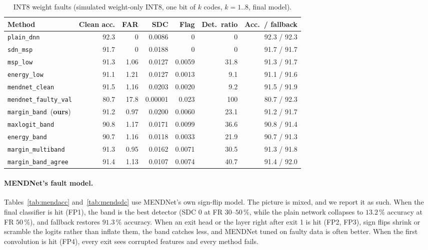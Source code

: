 \documentclass[10pt,a4paper]{article}
\newcommand{\meth}[1]{\texttt{#1}}
\newcommand{\ours}{\meth{margin\_band}}
\begin{document}
\begin{table}[H]
\centering\small
\caption{INT8 weight faults (simulated weight-only INT8, one bit of $k$ codes, $k=1..8$, final model).}
\label{tab:int8}
\begin{adjustbox}{max width=\linewidth}
\begin{tabular}{@{}lrrrrrr@{}}
\toprule
Method & Clean acc. & FAR & SDC & Flag & Det.\ ratio & Acc.\ / fallback \\
\midrule
\meth{plain\_dnn}          & 92.3 & 0    & 0.0086  & 0       & 0    & 92.3 / 92.3 \\
\meth{sdn\_msp}            & 91.7 & 0    & 0.0188  & 0       & 0    & 91.7 / 91.7 \\
\meth{msp\_low}            & 91.3 & 1.06 & 0.0127  & 0.0059  & 31.8 & 91.3 / 91.7 \\
\meth{energy\_low}         & 91.1 & 1.21 & 0.0127  & 0.0013  & 9.1  & 91.1 / 91.6 \\
\meth{mendnet\_clean}      & 91.5 & 1.16 & 0.0203  & 0.0020  & 9.2  & 91.5 / 91.9 \\
\meth{mendnet\_faulty\_val}& 80.7 & 17.8 & 0.00001 & 0.023   & 100  & 80.7 / 92.3 \\
\midrule
\ours\ (\textbf{ours})     & 91.2 & 0.97 & 0.0200  & 0.0060  & 23.1 & 91.2 / 91.7 \\
\meth{maxlogit\_band}      & 90.8 & 1.17 & 0.0171  & 0.0099  & 36.6 & 90.8 / 91.4 \\
\meth{energy\_band}        & 90.7 & 1.16 & 0.0118  & 0.0033  & 21.9 & 90.7 / 91.3 \\
\meth{margin\_multiband}   & 91.3 & 0.95 & 0.0162  & 0.0071  & 30.5 & 91.3 / 91.8 \\
\meth{margin\_band\_agree} & 91.4 & 1.13 & 0.0107  & 0.0074  & 40.7 & 91.4 / 92.0 \\
\bottomrule
\end{tabular}
\end{adjustbox}
\end{table}

\paragraph{MENDNet's fault model.} Tables~\ref{tab:mendacc} and~\ref{tab:mendsdc} use MENDNet's own
sign-flip model. The picture is mixed, and we report it as such. When the final classifier is hit (FP1),
the band is the best detector (SDC $0$ at FR $30$--$50\,\%$, while the plain network collapses to
$13.2\,\%$ accuracy at FR $50\,\%$), and fallback restores $91.3\,\%$ accuracy. When an exit head or the
layer right after exit 1 is hit (FP2, FP3), sign flips shrink or scramble the logits rather than inflate
them, the band catches less, and MENDNet tuned on faulty data is often better. When the first convolution
is hit (FP4), every exit sees corrupted features and every method fails.
\end{document}
